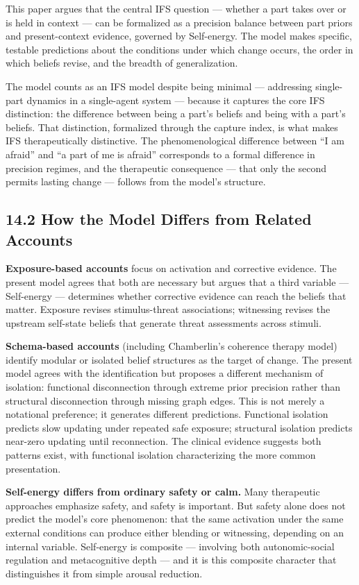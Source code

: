 \documentclass[11pt]{article}
\begin{document}
This paper argues that the central IFS question --- whether a part takes
over or is held in context --- can be formalized as a precision balance
between part priors and present-context evidence, governed by
Self-energy. The model makes specific, testable predictions about the
conditions under which change occurs, the order in which beliefs revise,
and the breadth of generalization.

The model counts as an IFS model despite being minimal --- addressing
single-part dynamics in a single-agent system --- because it captures
the core IFS distinction: the difference between being a part's beliefs
and being with a part's beliefs. That distinction, formalized through
the capture index, is what makes IFS therapeutically distinctive. The
phenomenological difference between ``I am afraid'' and ``a part of me
is afraid'' corresponds to a formal difference in precision regimes, and
the therapeutic consequence --- that only the second permits lasting
change --- follows from the model's structure.

\subsection{14.2 How the Model Differs from Related
Accounts}\label{how-the-model-differs-from-related-accounts}

\textbf{Exposure-based accounts} focus on activation and corrective
evidence. The present model agrees that both are necessary but argues
that a third variable --- Self-energy --- determines whether corrective
evidence can reach the beliefs that matter. Exposure revises
stimulus-threat associations; witnessing revises the upstream self-state
beliefs that generate threat assessments across stimuli.

\textbf{Schema-based accounts} (including Chamberlin's coherence therapy
model) identify modular or isolated belief structures as the target of
change. The present model agrees with the identification but proposes a
different mechanism of isolation: functional disconnection through
extreme prior precision rather than structural disconnection through
missing graph edges. This is not merely a notational preference; it
generates different predictions. Functional isolation predicts slow
updating under repeated safe exposure; structural isolation predicts
near-zero updating until reconnection. The clinical evidence suggests
both patterns exist, with functional isolation characterizing the more
common presentation.

\textbf{Self-energy differs from ordinary safety or calm.} Many
therapeutic approaches emphasize safety, and safety is important. But
safety alone does not predict the model's core phenomenon: that the same
activation under the same external conditions can produce either
blending or witnessing, depending on an internal variable. Self-energy
is composite --- involving both autonomic-social regulation and
metacognitive depth --- and it is this composite character that
distinguishes it from simple arousal reduction.
\end{document}
